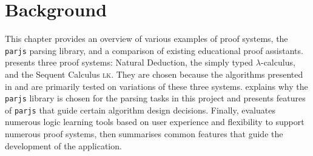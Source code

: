 \chapter{Background}\label{background}
This chapter provides an overview of various examples of proof systems, the \lstinline{parjs} parsing library, and a comparison of existing educational proof assistants.  presents three proof systems: Natural Deduction, the simply typed $\lambda$-calculus, and the Sequent Calculus \textsc{lk}. They are chosen because the algorithms presented in  and  are primarily tested on variations of these three systems.  explains why the \lstinline{parjs} library is chosen for the parsing tasks in this project and presents features of \lstinline{parjs} that guide certain algorithm design decisions. Finally,  evaluates numerous logic learning tools based on user experience and flexibility to support numerous proof systems, then summarises common features that guide the development of the application.




